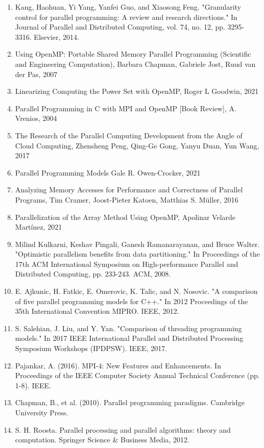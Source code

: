 \documentclass[12pt,conference]{IEEEtran}
\begin{document}
\begin{enumerate}
    \item Kang, Haohuan, Yi Yang, Yanfei Guo, and Xiaosong Feng. "Granularity control for parallel programming: A review and research directions." In Journal of Parallel and Distributed Computing, vol. 74, no. 12, pp. 3295-3316. Elsevier, 2014.

    \item Using OpenMP: Portable Shared Memory Parallel Programming (Scientific and Engineering Computation), Barbara Chapman, Gabriele Jost, Ruud van der Pas, 2007

    \item Linearizing Computing the Power Set with OpenMP, Roger L Goodwin, 2021

    \item Parallel Programming in C with MPI and OpenMP [Book Review], A. Vrenios, 2004

    \item The Research of the Parallel Computing Development from the Angle of Cloud Computing, Zhensheng Peng, Qing-Ge Gong, Yanyu Duan, Yun Wang, 2017

    \item Parallel Programming Models Gale R. Owen-Crocker, 2021

    \item Analyzing Memory Accesses for Performance and Correctness of Parallel Programs, Tim Cramer, Joost-Pieter Katoen, Matthias S. Müller, 2016
    
    \item Parallelization of the Array Method Using OpenMP, Apolinar Velarde Martínez, 2021

    \item Milind Kulkarni, Keshav Pingali, Ganesh Ramanarayanan, and Bruce Walter. "Optimistic parallelism benefits from data partitioning." In Proceedings of the 17th ACM International Symposium on High-performance Parallel and Distributed Computing, pp. 233-243. ACM, 2008.

    \item E. Ajkunic, H. Fatkic, E. Omerovic, K. Talic, and N. Nosovic. "A comparison of five parallel programming models for C++." In 2012 Proceedings of the 35th International Convention MIPRO. IEEE, 2012.
   
   \item S. Salehian, J. Liu, and Y. Yan. "Comparison of threading programming models." In 2017 IEEE International Parallel and Distributed Processing Symposium Workshops (IPDPSW). IEEE, 2017.

   \item Pajankar, A. (2016). MPI-4: New Features and Enhancements. In Proceedings of the IEEE Computer Society Annual Technical Conference (pp. 1-8). IEEE.
    
    \item Chapman, B., et al. (2010). Parallel programming paradigms. Cambridge University Press.

    \item S. H. Roosta. Parallel processing and parallel algorithms: theory and computation. Springer Science \& Business Media, 2012.
   
\end{enumerate}
\end{document}
